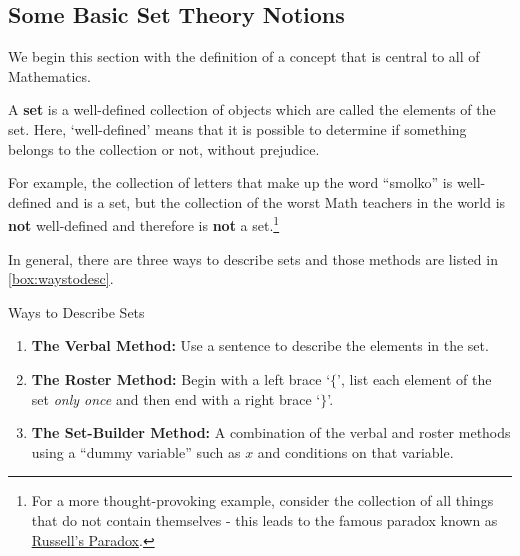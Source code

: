 

\setcounter{footnote}{0}

\label{AppSetTheory}

\subsection{Some Basic Set Theory Notions}
\label{SetTheoryNotions}

We begin this section with the definition of a concept that is central to all of Mathematics.

\begin{tcolorbox}
\begin{defn} \label{setdef}

A \textbf{set} is a well-defined collection of objects which are called the elements of the set.  Here, `well-defined' means that it is possible to determine if something belongs to the collection or not, without prejudice. 
\end{defn}
\end{tcolorbox}

For example, the collection of letters that make up the word ``smolko'' is well-defined and is a set, but the collection of the worst Math teachers in the world is \textbf{not} well-defined and therefore is \textbf{not} a set.\footnote{For a more thought-provoking example, consider the collection of all things that do not contain themselves - this leads to the famous paradox known as \href{http://en.wikipedia.org/wiki/Russell's_paradox}{\underline{Russell's Paradox}}.}  

In general, there are three ways to describe sets and those methods are listed in \autoref{box:waystodesc}.

\begin{floatbox}[label=box:waystodesc]{Ways to Describe Sets}

\begin{enumerate}[leftmargin=*]

\item \textbf{The Verbal Method:} Use a sentence to describe the elements in the set.

\item \textbf{The Roster Method:}  Begin with a left brace `$\{$', list each element of the set \textit{only once} and then end with a right brace `$\}$'.

\item \textbf{The Set-Builder Method:} A combination of the verbal and roster methods using a ``dummy variable'' such as $x$ and conditions on that variable.

\end{enumerate}
\end{floatbox}

